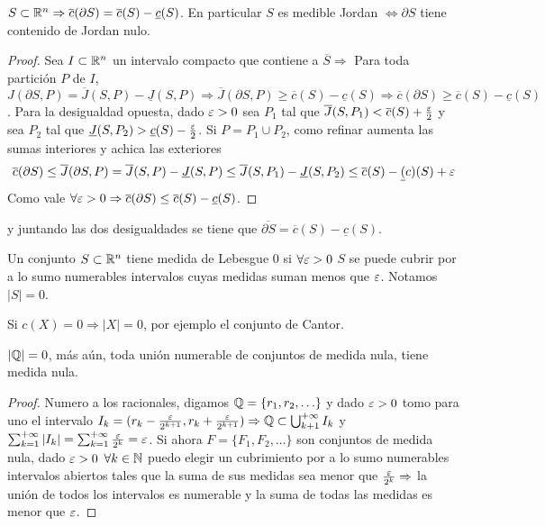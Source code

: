 \begin{theorem}
  \(S \subset \mathbb{R}^n \Rightarrow \overline{c}(\partial S) = \overline{c}(S) - \underline{c}(S)\). En particular \(S\) es medible Jordan \(\iff \partial S\) tiene contenido de Jordan nulo.
  \begin{proof}
    Sea \(I \subset \mathbb{R}^n\) un intervalo compacto que contiene a \(\overline{S} \Rightarrow \) Para toda partición \(P\) de \(I\), \(J(\partial S, P) = \overline{J}(S, P) - \underline{J}(S, P) \Rightarrow \overline{J}(\partial S, P) \geq \overline{c}(S) - \underline{c}(S) \Rightarrow \overline{c}(\partial S) \geq \overline{c}(S) - \underline{c}(S)\). Para la desigualdad opuesta, dado \(\varepsilon > 0\) sea \(P_1\) tal que \(\overline{J}(S, P_1) < \overline{c}(S) + \frac{\varepsilon}{2} \) y sea \(P_2\) tal que \(\underline{J}(S, P_2) > \underline{c}(S) - \frac{\varepsilon}{2} \). Si \(P = P_1 \cup P_2\), como refinar aumenta las sumas interiores y achica las exteriores \begin{align*}
      \overline{c}(\partial S) \leq \overline{J}(\partial S, P) = \overline{J}(S, P) - \underline{J}(S, P) \leq \overline{J}(S, P_1) - \underline{J}(S, P_2) \leq \overline{c}(S) - \underline(c)(S) + \varepsilon
    \end{align*}
    Como vale \(\forall \varepsilon > 0 \Rightarrow \overline{c}(\partial S) \leq \overline{c}(S) - \underline{c}(S)\).
  \end{proof} y juntando las dos desigualdades se tiene que \(\overline{\partial S} = \overline{c}(S) - \underline{c}(S)\).
\end{theorem}

\begin{definition}
  Un conjunto \(S \subset \mathbb{R}^n\) tiene medida de Lebesgue \(0\) si \(\forall \varepsilon > 0\) \(S\) se puede cubrir por a lo sumo numerables intervalos cuyas medidas suman menos que \(\varepsilon \). Notamos \(|S| = 0\).
\end{definition}

\begin{eg}
  Si \(c(X) = 0 \Rightarrow |X| = 0\), por ejemplo el conjunto de Cantor.
\end{eg}

\begin{eg}
  \(|\mathbb{Q}| = 0\), más aún, toda unión numerable de conjuntos de medida nula, tiene medida nula.
  \begin{proof}
    Numero a los racionales, digamos \(\mathbb{Q} = \{r_1, r_2, \ldots \} \) y dado \(\varepsilon > 0\) tomo para uno el intervalo \(I_k = (r_k - \frac{\varepsilon}{2^{k+1}}, r_k + \frac{\varepsilon}{2^{k+1}}) \Rightarrow \mathbb{Q} \subset \bigcup_{k + 1}^{+\infty} I_k\) y \(\sum_{k = 1}^{+\infty} |I_k| = \sum_{k = 1}^{+\infty} \frac{\varepsilon}{2^k} = \varepsilon \).
    Si ahora \(F = \{F_1, F_2, \ldots \} \) son conjuntos de medida nula, dado \(\varepsilon > 0\) \(\forall k \in \mathbb{N} \) puedo elegir un cubrimiento por a lo sumo numerables intervalos abiertos tales que la suma de sus medidas sea menor que \(\frac{\varepsilon}{2^k} \Rightarrow \) la unión de todos los intervalos es numerable y la suma de todas las medidas es menor que \(\varepsilon \).
  \end{proof}
\end{eg}

